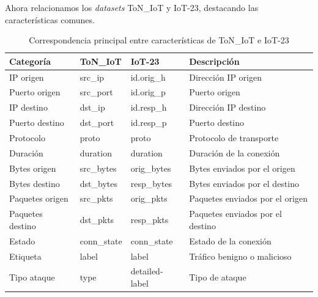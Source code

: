 Ahora relacionamos los \textit{datasets} ToN\_IoT y IoT-23, destacando las características comunes.
\begin{table}[H]
\centering
\caption{Correspondencia principal entre características de ToN\_IoT e IoT-23}
\label{tab:correspondencia-toniot-iot23}
\begin{tabularx}{\textwidth}{|l|l|l|X|}
\hline
\textbf{Categoría} & \textbf{ToN\_IoT} & \textbf{IoT-23} & \textbf{Descripción} \\
\hline
IP origen & src\_ip & id.orig\_h & Dirección IP origen \\
Puerto origen & src\_port & id.orig\_p & Puerto origen \\
IP destino & dst\_ip & id.resp\_h & Dirección IP destino \\
Puerto destino & dst\_port & id.resp\_p & Puerto destino \\
Protocolo & proto & proto & Protocolo de transporte \\
Duración & duration & duration & Duración de la conexión \\
Bytes origen & src\_bytes & orig\_bytes & Bytes enviados por el origen \\
Bytes destino & dst\_bytes & resp\_bytes & Bytes enviados por el destino \\
Paquetes origen & src\_pkts & orig\_pkts & Paquetes enviados por el origen \\
Paquetes destino & dst\_pkts & resp\_pkts & Paquetes enviados por el destino \\
Estado & conn\_state & conn\_state & Estado de la conexión \\
Etiqueta & label & label & Tráfico benigno o malicioso \\
Tipo ataque & type & detailed-label & Tipo de ataque \\
\hline
\end{tabularx}
\end{table}

